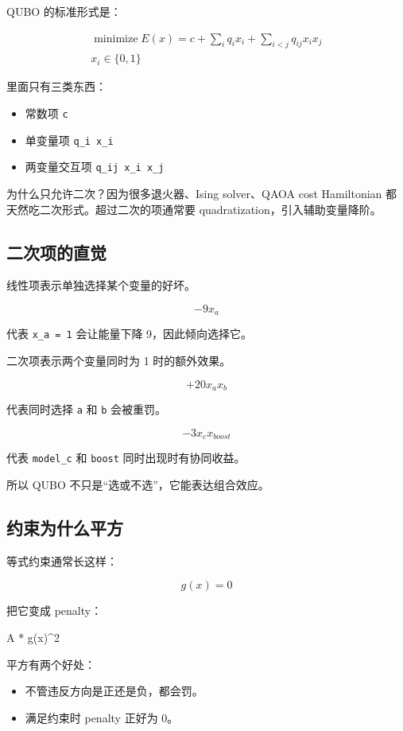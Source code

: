 \documentclass[UTF8,12pt,a4paper]{ctexart}
\begin{document}
QUBO 的标准形式是：

\[
\begin{aligned}
\operatorname*{minimize} E(x) = c + \sum_{i} q_{i} x_{i} + \sum_{i<j} q_{ij} x_{i} x_{j}\\
x_{i} \in \{0, 1\}
\end{aligned}
\]

里面只有三类东西：

\begin{itemize}
\item 常数项 \texttt{c}
\item 单变量项 \texttt{q\_i x\_i}
\item 两变量交互项 \texttt{q\_ij x\_i x\_j}
\end{itemize}

为什么只允许二次？因为很多退火器、Ising solver、QAOA cost Hamiltonian 都天然吃二次形式。超过二次的项通常要 quadratization，引入辅助变量降阶。

\subsection*{二次项的直觉}

线性项表示单独选择某个变量的好坏。

\[
-9 x_{a}
\]

代表 \texttt{x\_a = 1} 会让能量下降 9，因此倾向选择它。

二次项表示两个变量同时为 1 时的额外效果。

\[
+20 x_{a} x_{b}
\]

代表同时选择 \texttt{a} 和 \texttt{b} 会被重罚。

\[
-3 x_{c} x_{boost}
\]

代表 \texttt{model\_c} 和 \texttt{boost} 同时出现时有协同收益。

所以 QUBO 不只是“选或不选”，它能表达组合效应。

\subsection*{约束为什么平方}

等式约束通常长这样：

\[
g(x) = 0
\]

把它变成 penalty：

\begin{GuideVerbatim}
A * g(x)^2
\end{GuideVerbatim}

平方有两个好处：

\begin{itemize}
\item 不管违反方向是正还是负，都会罚。
\item 满足约束时 penalty 正好为 0。
\end{itemize}
\end{document}
